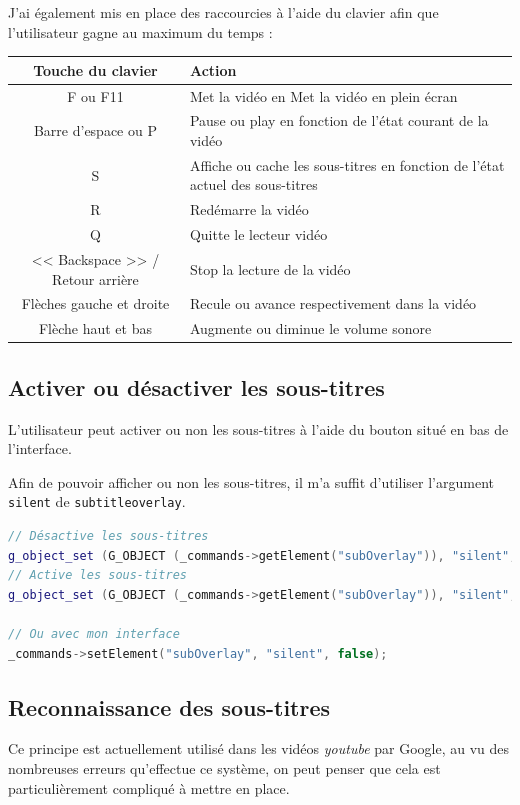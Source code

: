 \documentclass[a4paper, 11pt]{article}
\begin{document}
	J'ai également mis en place des raccourcies à l'aide du clavier afin que l'utilisateur gagne au maximum du temps : 

	\begin{tabular}{c|p{10cm}}
		\textbf{Touche du clavier} & \textbf{Action}\\
		\hline
		F ou F11& Met la vidéo en Met la vidéo en plein écran\\
		\hline
		Barre d'espace ou P&Pause ou play en fonction de l'état courant de la vidéo\\
		\hline
		S&Affiche ou cache les sous-titres en fonction de l'état actuel des sous-titres\\
		\hline
		R&Redémarre la vidéo\\
		\hline
		Q&Quitte le lecteur vidéo\\
		\hline
		<< Backspace >> / Retour arrière &Stop la lecture de la vidéo \\
		\hline
		Flèches gauche et droite&Recule ou avance respectivement dans la vidéo\\
		\hline
		Flèche haut et bas & Augmente ou diminue le volume sonore\\
		\hline
	\end{tabular}
	\subsection{Activer ou désactiver les sous-titres}
	L'utilisateur peut activer ou non les sous-titres à l'aide du bouton situé en bas de l'interface. 

	Afin de pouvoir afficher ou non les sous-titres, il m'a suffit d'utiliser l'argument \texttt{silent} de \texttt{subtitleoverlay}.
	\begin{lstlisting}[language=C++, caption=Affichage ou non des sous-titres]
// Désactive les sous-titres
g_object_set (G_OBJECT (_commands->getElement("subOverlay")), "silent", false, NULL); 
// Active les sous-titres
g_object_set (G_OBJECT (_commands->getElement("subOverlay")), "silent", true, NULL); 

// Ou avec mon interface
_commands->setElement("subOverlay", "silent", false);

	\end{lstlisting}

	\subsection{Reconnaissance des sous-titres}
	Ce principe est actuellement utilisé dans les vidéos \textit{youtube} par Google, au vu des nombreuses erreurs qu'effectue ce système, on peut penser que
	cela est particulièrement compliqué à mettre en place.
\end{document}
